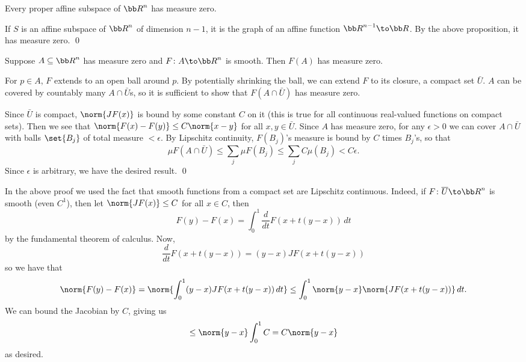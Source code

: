 \eproof

\bcoro

    Every proper affine subspace of $\bR^n$ has measure zero.

\ecoro

\bproof

    If $S$ is an affine subspace of $\bR^n$ of dimension $n-1$, it is the graph of an affine function $\bR^{n-1}\to\bR$.
    By the above proposition, it has measure zero.
    \qed

\eproof

\bprop

    Suppose $A\subseteq\bR^n$ has measure zero and $F\colon A\to\bR^n$ is smooth.
    Then $F(A)$ has measure zero.

\eprop

\bproof

    For $p\in A$, $F$ extends to an open ball around $p$.
    By potentially shrinking the ball, we can extend $F$ to its closure, a compact set $\bar U$.
    $A$ can be covered by countably many $A\cap\bar U$s, so it is sufficient to show that $F(A\cap\bar U)$ has measure zero.

    Since $\bar U$ is compact, $\norm{JF(x)}$ is bound by some constant $C$ on it (this is true for all continuous real-valued functions
    on compact sets).
    Then we see that $\norm{F(x)-F(y)}\leq C\norm{x-y}$ for all $x,y\in\bar U$.
    Since $A$ has measure zero, for any $\epsilon>0$ we can cover $A\cap\bar U$ with balls $\set{B_j}$ of total measure $<\epsilon$.
    By Lipschitz continuity, $F(B_j)$'s measure is bound by $C$ times $B_j$'s, so that
    $$ \mu F(A\cap\bar U) \leq \sum_j \mu F(B_j) \leq \sum_jC\mu(B_j) < C\epsilon . $$
    Since $\epsilon$ is arbitrary, we have the desired result.
    \qed

\eproof

\bnote

    In the above proof we used the fact that smooth functions from a compact set are Lipschitz continuous.
    Indeed, if $F\colon\bar U\to\bR^n$ is smooth (even $C^1$), then let $\norm{JF(x)}\leq C$ for all $x\in C$, then
    $$ F(y) - F(x) = \int_0^1\frac d{dt}F(x+t(y-x))\,dt $$
    by the fundamental theorem of calculus.
    Now,
    $$ \frac d{dt}F(x+t(y-x)) = (y-x)JF(x+t(y-x)) $$
    so we have that
    $$ \norm{F(y)-F(x)} = \norm{\int_0^1 (y-x)JF(x+t(y-x))\,dt} \leq \int_0^1\norm{y-x}\norm{JF(x+t(y-x))}\,dt . $$
    We can bound the Jacobian by $C$, giving us
    $$ \leq \norm{y-x} \int_0^1 C = C\norm{y-x} $$
    as desired.

